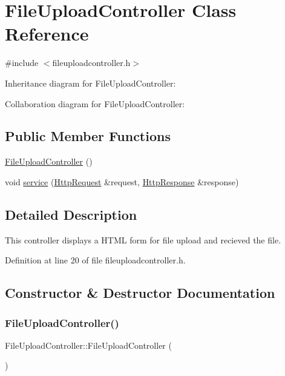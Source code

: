 \hypertarget{class_file_upload_controller}{}\section{File\+Upload\+Controller Class Reference}
\label{class_file_upload_controller}


{\ttfamily \#include $<$fileuploadcontroller.\+h$>$}



Inheritance diagram for File\+Upload\+Controller\+:


Collaboration diagram for File\+Upload\+Controller\+:
\subsection*{Public Member Functions}
\begin{DoxyCompactItemize}
\item 
\mbox{\hyperlink{class_file_upload_controller_a5c8c3e06e9b728fbea0f57d85273b1b3}{File\+Upload\+Controller}} ()
\item 
void \mbox{\hyperlink{class_file_upload_controller_adfa8811a91e6f1ddf7f28f4d98cb1679}{service}} (\mbox{\hyperlink{classstefanfrings_1_1_http_request}{Http\+Request}} \&request, \mbox{\hyperlink{classstefanfrings_1_1_http_response}{Http\+Response}} \&response)
\end{DoxyCompactItemize}


\subsection{Detailed Description}
This controller displays a H\+T\+ML form for file upload and recieved the file. 

Definition at line 20 of file fileuploadcontroller.\+h.



\subsection{Constructor \& Destructor Documentation}
\mbox{\label{class_file_upload_controller_a5c8c3e06e9b728fbea0f57d85273b1b3}} 
\subsubsection{\texorpdfstring{File\+Upload\+Controller()}{FileUploadController()}}
{\footnotesize\ttfamily File\+Upload\+Controller\+::\+File\+Upload\+Controller (\begin{DoxyParamCaption}{ }\end{DoxyParamCaption})}

